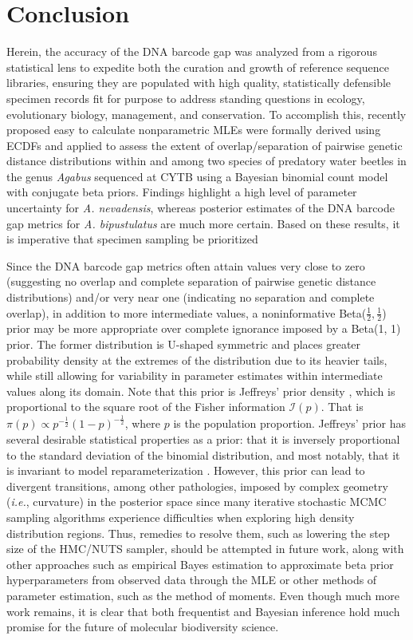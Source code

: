 \documentclass[12pt]{article}
\begin{document}
\section{Conclusion}

Herein, the accuracy of the DNA barcode gap was analyzed from a rigorous statistical lens to expedite both the curation and growth of reference sequence libraries, ensuring they are populated with high quality, statistically defensible specimen records fit for purpose to address standing questions in ecology, evolutionary biology, management, and conservation. To accomplish this, recently proposed easy to calculate nonparametric MLEs were formally derived using ECDFs and applied to assess the extent of overlap/separation of pairwise genetic distance distributions within and among two species of predatory water beetles in the genus \textit{Agabus} sequenced at CYTB using a Bayesian binomial count model with conjugate beta priors. Findings highlight a high level of parameter uncertainty for \textit{A. nevadensis}, whereas posterior estimates of the DNA barcode gap metrics for \textit{A. bipustulatus} are much more certain. Based on these results, it is imperative that specimen sampling be prioritized  

Since the DNA barcode gap metrics often attain values very close to zero (suggesting no overlap and complete separation of pairwise genetic distance distributions) and/or very near one (indicating no separation and complete overlap), in addition to more intermediate values, a noninformative Beta($\frac{1}{2}, \frac{1}{2}$) prior may be more appropriate over complete ignorance imposed by a Beta(1, 1) prior. The former distribution is U-shaped symmetric and places greater probability density at the extremes of the distribution due to its heavier tails, while still allowing for variability in parameter estimates within intermediate values along its domain. Note that this prior is Jeffreys' prior density \citep{jeffreys1946invariant}, which is  proportional to the square root of the Fisher information $\mathcal{I}(p)$. That is
$\pi(p) \propto p^{-\frac{1}{2}}(1-p)^{-\frac{1}{2}}$, where $p$ is the population proportion. Jeffreys' prior has several desirable statistical  properties as a prior: that it is inversely proportional to the standard deviation of the binomial distribution, and most notably, that it is invariant to model reparameterization \citep{gelman2014bayesian}. However, this prior can lead to divergent transitions, among other pathologies, imposed by complex geometry (\textit{i.e.}, curvature) in the posterior space since many iterative stochastic MCMC sampling algorithms experience difficulties when exploring high density distribution regions. Thus, remedies to resolve them, such as lowering the step size of the HMC/NUTS sampler, should be attempted in future work, along with other approaches such as empirical Bayes estimation to approximate beta prior hyperparameters from observed data through the MLE or other methods of parameter estimation, such as the method of moments. Even though much more work remains, it is clear that both frequentist and Bayesian inference hold much promise for the future of molecular biodiversity science.
\end{document}

